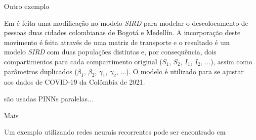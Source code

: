 Outro exemplo  \cite{shaier-etal:22-dinns}

Em \cite{ogueda-oliva:23-colombia-duas-cidades} é feita uma modificação no
modelo \textit{SIRD} para modelar o descolocamento de pessoas duas 
cidades colombianas de Bogotá e Medellín. A incorporação deste movimento 
é feita através de uma matriz de transporte e o resultado é um modelo \textit{SIRD}
com duas populações distintas e, por consequência, dois compartimentos para cada
compartimento original ($S_1$, $S_2$, $I_1$, $I_2$, ...), assim como parâmetros 
duplicados ($\beta_1$, $\beta_2$, $\gamma_1$, $\gamma_2$, ...). O modelo é utilizado
para se ajustar aos dados de COVID-19 da Colômbia de 2021.

\cite{ning-etal:23-pinns-paralelas} são usadas PINNs paralelas...

Mais  \cite{hu-etal:22-identificabilidade}

Um exemplo utilizando redes neurais recorrentes pode ser encontrado 
em \cite{rodriguez-etal:2022-einns}

